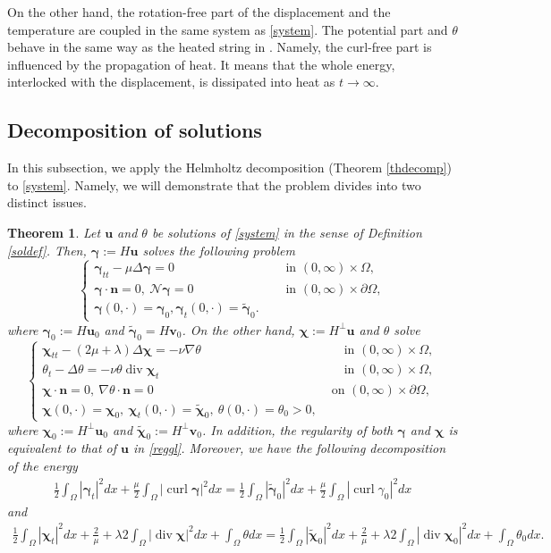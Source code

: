 \documentclass[11pt]{article}
\numberwithin{equation}{section}
\theoremstyle{plain}
\newtheorem{tw}[defi]{Theorem}
\newcommand\bb[1]{\mathbf{#1}}
\newcommand{\tn}{\Omega}
\newcommand{\io}{\int_{\Omega}}
\newcommand{\ul}{\frac{1}{2}}
\newcommand{\hp}{H^{\perp}}
\renewcommand{\div}{\operatorname{div}}
\DeclareMathOperator{\curl}{curl}
\newcommand{\wspnd}{2\mu+\lambda}
\newcommand{\bu}{\bb{u}}
\newcommand{\bs}[1]{\boldsymbol{#1}}
\newcommand{\N}{\mathcal{N}}
\begin{document}
On the other hand, the rotation-free part of the displacement and the temperature are coupled in the same system as \ref{system}. The potential part and $\theta$ behave in the same way as the heated string in \cite{BC2}. Namely, the curl-free part is influenced by the propagation of heat. It means that the whole energy, interlocked with the displacement, is dissipated into heat as $t\to\infty$.

\subsection{Decomposition of solutions}\label{subdec}

In this subsection, we apply the Helmholtz decomposition (Theorem \ref{thdecomp}) to \eqref{system}. Namely, we will demonstrate that the problem divides into two distinct issues.
\begin{tw}
Let $\bb u$ and $\theta$ be solutions of \eqref{system} in the sense of Definition \ref{soldef}. Then, $\bs\gamma:=H\bb u$ solves the following problem
\begin{equation}\label{eqdecnondiv}
\begin{cases}
\bs\gamma_{tt}-\mu\Delta \bs\gamma =0& \quad \text{ in } (0,\infty)\times \tn,\\
\bs\gamma\cdot\bb n=0,\ \N\bs\gamma=0&\quad\text{ in }(0,\infty)\times \partial\Omega,\\
\bs{\gamma}(0,\cdot)=\bs{\gamma}_0, \bs{\gamma}_t(0,\cdot) = \tilde{\bs\gamma}_0.&
\end{cases}
\end{equation}
where $\bs\gamma_0:=H\bb u_0$ and $\tilde{\bs\gamma}_0=H\bb v_0$. On the other hand, $\bs\chi:=\hp \bb u$ and $\theta$ solve
\begin{equation}\label{eqdecnoncurl}
\begin{cases}
\bs\chi_{tt}-(\wspnd)\Delta\bs\chi=-\nu\nabla\theta & \quad \text{ in } (0,\infty)\times \tn,\\
\theta_t - \Delta \theta =- \nu\theta \div{\bs\chi}_t& \quad \text{ in }  (0,\infty)\times\tn,\\
\bs\chi\cdot \bb n=0,\ \nabla\theta\cdot\bb n=0&\text{ on }(0,\infty)\times\partial\Omega,\\
\bs{\chi}(0,\cdot)=\bs{\chi}_0,\ \bs{\chi}_t(0,\cdot) = \tilde{\bs\chi}_0,\ \theta(0,\cdot)=\theta_0>0,&
\end{cases}
\end{equation}
where $\bs\chi_0:=\hp \bb u_0$ and  $\tilde{\bs{\chi}}_0:=\hp \bb v_0$. In addition, the regularity of both $\bs\gamma$ and $\bs\chi$ is equivalent to that of $\bu$ in \eqref{reggl}. Moreover, we have the following decomposition of the energy
\begin{align*}
\ul\io |\bs\gamma_t|^2dx+\frac\mu2\io |\curl \bs\gamma|^2dx=\ul\io |\tilde{\bs\gamma}_0|^2dx+\frac\mu2\io |\curl \gamma_0|^2dx
\end{align*}
and
\begin{align*}
\ul\io |\bs\chi_t|^2dx+\frac\wspnd2\io |\div\bs\chi|^2dx+\io\theta dx=\ul\io |\tilde{\bs\chi}_0|^2dx+\frac\wspnd2\io |\div\bs\chi_0|^2dx+\io\theta_0 dx.
\end{align*}
\end{tw}
\end{document}
